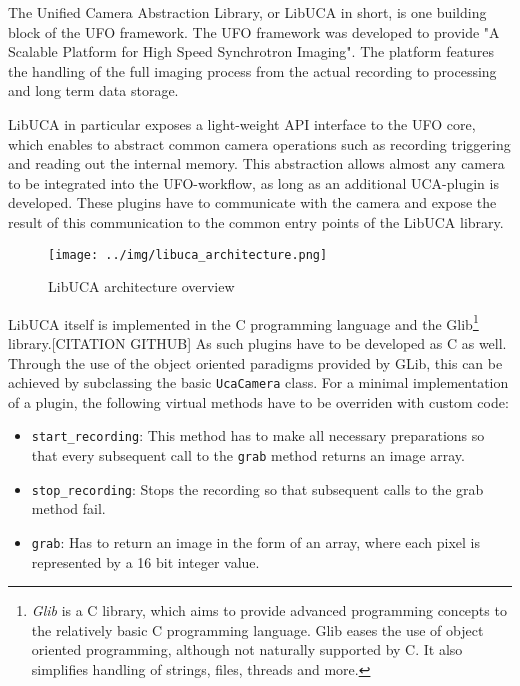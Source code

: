 The Unified Camera Abstraction Library, or LibUCA in short, is one building block of the UFO framework. The UFO framework was developed to provide "A Scalable Platform for High Speed Synchrotron Imaging". The platform features the handling of the full imaging process from the actual recording to processing and long term data storage.\cite{UFOPaper}\par
LibUCA in particular exposes a light-weight API interface to the UFO core, which enables to abstract common camera operations such as recording triggering and reading out the internal memory. This abstraction allows almost any camera to be integrated into the UFO-workflow, as long as an additional UCA-plugin is developed.  These plugins have to communicate with the camera and expose the result of this communication to the common entry points of the LibUCA library.\\

\begin{figure}[h]
	\caption[LibUCA architecture]{LibUCA architecture overview \footnotemark}
	\texttt{[image: ../img/libuca\_architecture.png]} 
	\label{fig:phantom1}
\end{figure}

LibUCA itself is implemented in the C programming language and the Glib\footnote{\textit{Glib} is a C library, which aims to provide advanced programming concepts to the relatively basic C programming language. Glib eases the use of object oriented programming, although not naturally supported by C. It also simplifies handling of strings, files, threads and more.} library.[CITATION GITHUB] As such plugins have to be developed as C as well. Through the use of the object oriented paradigms provided by GLib, this can be achieved by subclassing the basic \texttt{UcaCamera} class. For a minimal implementation of a plugin, the following virtual methods have to be overriden with custom code:\cite{LibucaDoc}

\begin{itemize}
\item \texttt{start\_recording}: This method has to make all necessary preparations so that every subsequent call to the \texttt{grab} method returns an image array.

\item \texttt{stop\_recording}: Stops the recording so that subsequent calls to the grab method fail.

\item \texttt{grab}: Has to return an image in the form of an array, where each pixel is represented by a 16 bit integer value.
\end{itemize}


